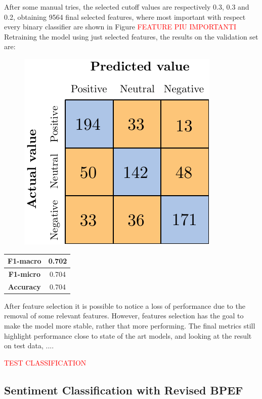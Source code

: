After some manual tries, the selected cutoff values are respectively 0.3, 0.3 and 0.2, obtaining 9564 final selected features, where most important with respect every binary classifier are shown in Figure %
\textcolor{red}{FEATURE PIU IMPORTANTI}
 Retraining the model using just selected features, the results on the validation set are:
\begin{figure}[H]
	\centering
	\includegraphics[scale=1]{figures/conf_matrices/twitter_snt_svm/twitter_snt_svm_afs.pdf}
	\label{fig:tw_snt_svm_afs}
\end{figure}

\begin{center}
	\begin{tabular}{ | c | c | } 
		\hline
		\textbf{F1-macro} & 0.702 \\
		\hline
		\textbf{F1-micro} & 0.704 \\ 
		\hline
		\textbf{Accuracy} & 0.704 \\ 
		\hline
	\end{tabular}
\end{center}

After feature selection it is possible to notice a loss of performance due to the removal of some relevant features. However, features selection has the goal to make the model more stable, rather that more performing. The final metrics still highlight performance close to state of the art models, and looking at the result on test data, .... %

\textcolor{red}{TEST CLASSIFICATION}


\subsection{Sentiment Classification with Revised BPEF}


